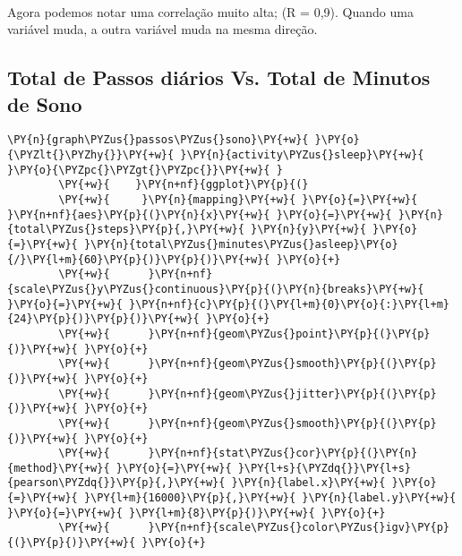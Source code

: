 \begin{center}
\end{center}
{ \hspace*{\fill} \\}

Agora podemos notar uma correlação muito alta; (R = 0,9). Quando uma
variável muda, a outra variável muda na mesma direção.

\subsection{Total de Passos diários Vs. Total de Minutos de Sono}

\begin{tcolorbox}[breakable, size=fbox, boxrule=1pt, pad at break*=1mm,colback=cellbackground, colframe=cellborder]
    \begin{Verbatim}[commandchars=\\\{\}]
        \PY{n}{graph\PYZus{}passos\PYZus{}sono}\PY{+w}{ }\PY{o}{\PYZlt{}\PYZhy{}}\PY{+w}{ }\PY{n}{activity\PYZus{}sleep}\PY{+w}{ }\PY{o}{\PYZpc{}\PYZgt{}\PYZpc{}}\PY{+w}{ }
        \PY{+w}{    }\PY{n+nf}{ggplot}\PY{p}{(}
        \PY{+w}{     }\PY{n}{mapping}\PY{+w}{ }\PY{o}{=}\PY{+w}{ }\PY{n+nf}{aes}\PY{p}{(}\PY{n}{x}\PY{+w}{ }\PY{o}{=}\PY{+w}{ }\PY{n}{total\PYZus{}steps}\PY{p}{,}\PY{+w}{ }\PY{n}{y}\PY{+w}{ }\PY{o}{=}\PY{+w}{ }\PY{n}{total\PYZus{}minutes\PYZus{}asleep}\PY{o}{/}\PY{l+m}{60}\PY{p}{)}\PY{p}{)}\PY{+w}{ }\PY{o}{+}
        \PY{+w}{      }\PY{n+nf}{scale\PYZus{}y\PYZus{}continuous}\PY{p}{(}\PY{n}{breaks}\PY{+w}{ }\PY{o}{=}\PY{+w}{ }\PY{n+nf}{c}\PY{p}{(}\PY{l+m}{0}\PY{o}{:}\PY{l+m}{24}\PY{p}{)}\PY{p}{)}\PY{+w}{ }\PY{o}{+}
        \PY{+w}{      }\PY{n+nf}{geom\PYZus{}point}\PY{p}{(}\PY{p}{)}\PY{+w}{ }\PY{o}{+}
        \PY{+w}{      }\PY{n+nf}{geom\PYZus{}smooth}\PY{p}{(}\PY{p}{)}\PY{+w}{ }\PY{o}{+}
        \PY{+w}{      }\PY{n+nf}{geom\PYZus{}jitter}\PY{p}{(}\PY{p}{)}\PY{+w}{ }\PY{o}{+}
        \PY{+w}{      }\PY{n+nf}{geom\PYZus{}smooth}\PY{p}{(}\PY{p}{)}\PY{+w}{ }\PY{o}{+}
        \PY{+w}{      }\PY{n+nf}{stat\PYZus{}cor}\PY{p}{(}\PY{n}{method}\PY{+w}{ }\PY{o}{=}\PY{+w}{ }\PY{l+s}{\PYZdq{}}\PY{l+s}{pearson\PYZdq{}}\PY{p}{,}\PY{+w}{ }\PY{n}{label.x}\PY{+w}{ }\PY{o}{=}\PY{+w}{ }\PY{l+m}{16000}\PY{p}{,}\PY{+w}{ }\PY{n}{label.y}\PY{+w}{ }\PY{o}{=}\PY{+w}{ }\PY{l+m}{8}\PY{p}{)}\PY{+w}{ }\PY{o}{+}
        \PY{+w}{      }\PY{n+nf}{scale\PYZus{}color\PYZus{}igv}\PY{p}{(}\PY{p}{)}\PY{+w}{ }\PY{o}{+}

\end{Verbatim}
\end{tcolorbox}
